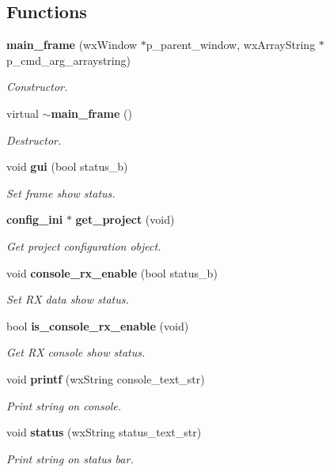 \subsection*{Functions}
\begin{DoxyCompactItemize}
\item 
\textbf{ main\+\_\+frame} (wx\+Window $\ast$p\+\_\+parent\+\_\+window, wx\+Array\+String $\ast$p\+\_\+cmd\+\_\+arg\+\_\+arraystring)
\begin{DoxyCompactList}\small\item\em Constructor. \end{DoxyCompactList}\item 
virtual \textbf{ $\sim$main\+\_\+frame} ()
\begin{DoxyCompactList}\small\item\em Destructor. \end{DoxyCompactList}\item 
void \textbf{ gui} (bool status\+\_\+b)
\begin{DoxyCompactList}\small\item\em Set frame show status. \end{DoxyCompactList}\item 
\textbf{ config\+\_\+ini} $\ast$ \textbf{ get\+\_\+project} (void)
\begin{DoxyCompactList}\small\item\em Get project configuration object. \end{DoxyCompactList}\item 
void \textbf{ console\+\_\+rx\+\_\+enable} (bool status\+\_\+b)
\begin{DoxyCompactList}\small\item\em Set RX data show status. \end{DoxyCompactList}\item 
bool \textbf{ is\+\_\+console\+\_\+rx\+\_\+enable} (void)
\begin{DoxyCompactList}\small\item\em Get RX console show status. \end{DoxyCompactList}\item 
void \textbf{ printf} (wx\+String console\+\_\+text\+\_\+str)
\begin{DoxyCompactList}\small\item\em Print string on console. \end{DoxyCompactList}\item 
void \textbf{ status} (wx\+String status\+\_\+text\+\_\+str)
\begin{DoxyCompactList}\small\item\em Print string on status bar. \end{DoxyCompactList}\item 

\end{DoxyCompactItemize}
